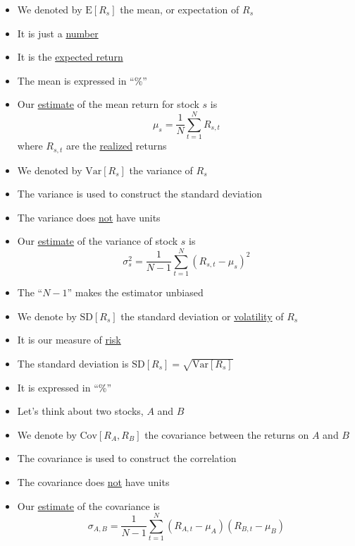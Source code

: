 \documentclass{beamer}
\begin{document}
\begin{frame}{}
	\begin{itemize}
		\item We denoted by $\text{E}[R_{s}]$ the mean, or expectation of $R_{s}$
		\item It is just a \underline{number} 
		\item It is the \underline{expected return}
		\item The mean is expressed in ``\%''
		\item Our \underline{estimate} of the mean return for stock $s$ is
		\begin{equation*}
			\mu_{s}=\frac{1}{N}\sum_{t=1}^{N}{R_{s,t}}
		\end{equation*}
		where $R_{s,t}$ are the \underline{realized} returns
	\end{itemize}
\end{frame}

\begin{frame}{}
	\begin{itemize}
		\item We denoted by $\text{Var}[R_{s}]$ the variance of $R_{s}$
		\item The variance is used to construct the standard deviation
		\item The variance does \underline{not} have units
		\item Our \underline{estimate} of the variance of stock $s$ is
		\begin{equation*}
			\sigma_{s}^{2}=\frac{1}{N-1}\sum_{t=1}^{N}{(R_{s,t}-\mu_{s})^{2}}
		\end{equation*}
		\item The ``$N-1$'' makes the estimator unbiased
		\item We denote by $\text{SD}[R_{s}]$ the standard deviation or \underline{volatility} of $R_{s}$
		\item It is our measure of \underline{risk}
		\item The standard deviation is $\text{SD}[R_{s}]=\sqrt{\text{Var}[R_{s}]}$	
		\item It is expressed in ``\%''
	\end{itemize}
\end{frame}

\begin{frame}{}
	\begin{itemize}
		\item Let's think about two stocks, $A$ and $B$	
		\item We denote by $\text{Cov}[R_{A},R_{B}]$ the covariance between the returns on $A$ and $B$
		\item The covariance is used to construct the correlation
		\item The covariance does \underline{not} have units
		\item Our \underline{estimate} of the covariance is 
		\begin{equation*}
			\sigma_{A,B}=\frac{1}{N-1}\sum_{t=1}^{N}{(R_{A,t}-\mu_{A})(R_{B,t}-\mu_{B})}
		\end{equation*}
	\end{itemize}
\end{frame}
\end{document}
